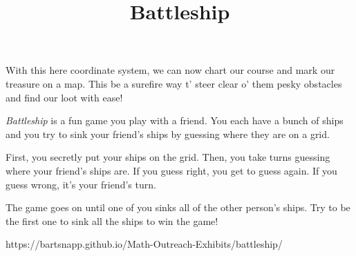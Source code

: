 \documentclass{../exhibit}
\title{Battleship}
\begin{document}
\begin{context}
With this here coordinate system, we can now chart our course and mark our treasure on a map. This be a surefire way t' steer clear o' them pesky obstacles and find our loot with ease!
\end{context}

\begin{directions}
\textit{Battleship} is a fun game you play with a friend. You each have a bunch of ships and you try to sink your friend's ships by guessing where they are on a grid.

First, you secretly put your ships on the grid. Then, you take turns guessing where your friend's ships are. If you guess right, you get to guess again. If you guess wrong, it's your friend's turn.

The game goes on until one of you sinks all of the other person's ships. Try to be the first one to sink all the ships to win the game!

\end{directions}

\begin{example}
\end{example}

\begin{mathConnections}
  https://bartsnapp.github.io/Math-Outreach-Exhibits/battleship/
\end{mathConnections}
\end{document}
